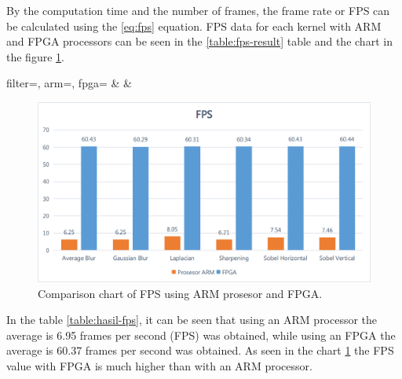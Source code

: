 By the computation time and the number of frames, the frame rate or FPS can be calculated using the \ref{eq:fps} equation. FPS data for each kernel with ARM and FPGA processors can be seen in the \ref{table:fps-result} table and the chart in the figure \ref{fig:chart-fps}.
\begin{atable}
    \caption{Comparison table of FPS using ARM prosesor and FPGA.}
    \label{table:hasil-fps}
        {
            filter=\filter, 
            arm=\arm, 
            fpga=\fpga}
        {
            \filter & 
            \arm & 
            \fpga }
\end{atable}
\begin{figure}[H]
    \includegraphics[width=0.81\linewidth, center]{images/chart/chart-fps.png}
    \caption{Comparison chart of FPS using ARM prosesor and FPGA.}
    \label{fig:chart-fps}
\end{figure}


In the table \ref{table:hasil-fps}, it can be seen that using an ARM processor the average is 6.95 frames per second (FPS) was obtained, while using an FPGA the average is 60.37 frames per second was obtained. As seen in the chart \ref{fig:chart-fps} the FPS value with FPGA is much higher than with an ARM processor.

